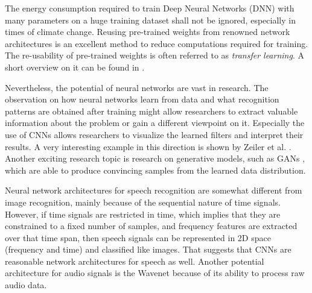 The energy consumption required to train Deep Neural Networks (DNN) with many parameters on a huge training dataset shall not be ignored, especially in times of climate change.
Reusing pre-trained weights from renowned network architectures is an excellent method to reduce computations required for training.
The re-usability of pre-trained weights is often referred to as \emph{transfer learning}.
A short overview on it can be found in \cite{TransferLearning}.

Nevertheless, the potential of neural networks are vast in research.
The observation on how neural networks learn from data and what recognition patterns are obtained after training might allow researchers to extract valuable information about the problem or gain a different viewpoint on it.
Especially the use of CNNs allows researchers to visualize the learned filters and interpret their results.
A very interesting example in this direction is shown by Zeiler et al. \cite{Zeiler2013}.
Another exciting research topic is research on generative models, such as GANs \cite{Goodfellow2014}, which are able to produce convincing samples from the learned data distribution.

Neural network architectures for speech recognition are somewhat different from image recognition, mainly because of the sequential nature of time signals.
However, if time signals are restricted in time, which implies that they are constrained to a fixed number of samples, and frequency features are extracted over that time span, then speech signals can be represented in 2D space (frequency and time) and classified like images.
That suggests that CNNs are reasonable network architectures for speech as well.
Another potential architecture for audio signals is the Wavenet \cite{Oord2016} because of its ability to process raw audio data.